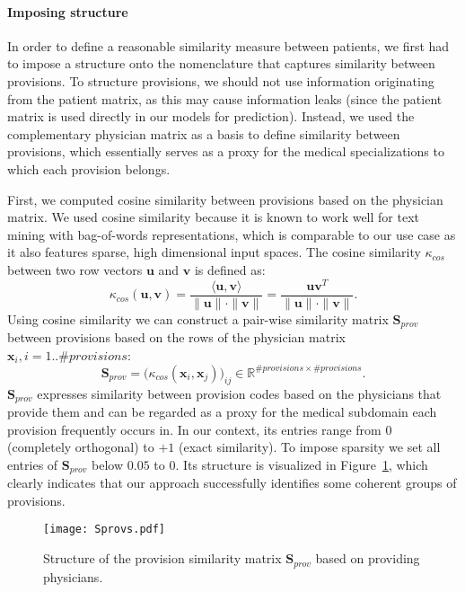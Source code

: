 \documentclass[twoside,11pt]{article}
\begin{document}
\paragraph{Imposing structure} In order to define a reasonable similarity measure between patients, we first had to impose a structure onto the nomenclature that captures similarity between provisions. To structure provisions, we should not use information originating from the patient matrix, as this may cause information leaks (since the patient matrix is used directly in our models for prediction). Instead, we used the complementary physician matrix as a basis to define similarity between provisions, which essentially serves as a proxy for the medical specializations to which each provision belongs. 

First, we computed cosine similarity between provisions based on the physician matrix. We used cosine similarity because it is known to work well for text mining with bag-of-words representations, which is comparable to our use case as it also features sparse, high dimensional input spaces. The cosine similarity $\kappa_{cos}$ between two row vectors $\mathbf{u}$ and $\mathbf{v}$ is defined as:
\begin{equation}
\kappa_{cos}(\mathbf{u}, \mathbf{v}) = \frac{\langle \mathbf{u}, \mathbf{v} \rangle}{\|\mathbf{u}\| \cdot \|\mathbf{v}\|} = \frac{\mathbf{u}\mathbf{v}^T}{\|\mathbf{u}\| \cdot \|\mathbf{v}\|}.
\label{eq:cosine}
\end{equation}
Using cosine similarity we can construct a pair-wise similarity matrix $\mathbf{S}_{prov}$ between provisions based on the rows of the physician matrix $\mathbf{x}_i, i=1..\# provisions$:
\begin{equation}
\mathbf{S}_{prov} = \big(\kappa_{cos}(\mathbf{x}_i,\mathbf{x}_j)\big)_{ij} \in \mathbb{R}^{\# provisions \times \# provisions}.
\label{eq:cosine-kernel}
\end{equation}
$\mathbf{S}_{prov}$ expresses similarity between provision codes based on the physicians that provide them and can be regarded as a proxy for the medical subdomain each provision frequently occurs in. In our context, its entries range from $0$ (completely orthogonal) to $+1$ (exact similarity). To impose sparsity we set all entries of $\mathbf{S}_{prov}$ below $0.05$ to $0$. Its structure is visualized in Figure~\ref{fig:Sprovs}, which clearly indicates that our approach successfully identifies some coherent groups of provisions.

\begin{figure}[!h]
  \centering
  \texttt{[image: Sprovs.pdf]}
  \caption{Structure of the provision similarity matrix $\mathbf{S}_{prov}$ based on providing physicians.} 
  \label{fig:Sprovs}
\end{figure}
\end{document}
